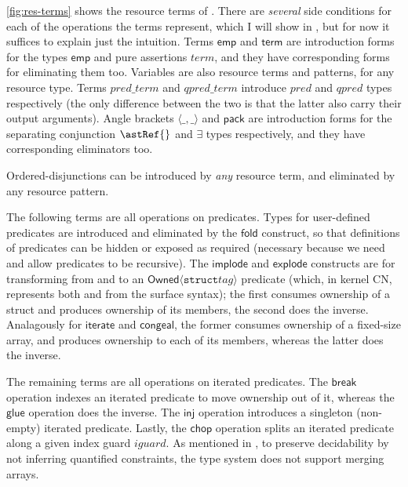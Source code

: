\cref{fig:res-terms} shows the resource terms of . There are
\emph{several} side conditions for each of the operations the terms represent,
which I will show in , but for now it suffices to
explain just the intuition. Terms $\mathsf{emp}$ and
$\mathsf{term}$ are introduction forms for the types $\mathsf{emp}$ and pure
assertions $\mathit{term}$, and they have corresponding forms for eliminating
them too. Variables are also resource terms and patterns, for any resource
type. Terms $\mathit{pred\_term}$ and $\mathit{qpred\_term}$ introduce
$\mathit{pred}$ and $\mathit{qpred}$ types respectively (the only difference
between the two is that the latter also carry their output arguments). Angle
brackets $\langle \_ , \_ \rangle$ and $\mathsf{pack}$ are introduction forms
for the separating conjunction $\astRef{}$ and $\exists$ types respectively,
and they have corresponding eliminators too.

Ordered-disjunctions can be introduced by \emph{any} resource term, and
eliminated by any resource pattern.

The following terms are all operations on predicates. Types for
user-defined predicates are introduced and eliminated by the $\mathsf{fold}$
construct, so that definitions of predicates can be hidden or exposed as required
(necessary because we need and allow predicates to be recursive). The
$\mathsf{implode}$ and $\mathsf{explode}$ constructs are for transforming from
and to an $\mathsf{Owned}\langle \mathtt{struct} \mathit{tag} \rangle$ predicate
(which, in kernel CN, represents both  and
 from the surface syntax); the first consumes ownership of
a struct and produces ownership of its members, the second does the inverse.
Analagously for $\mathsf{iterate}$ and $\mathsf{congeal}$, the former consumes
ownership of a fixed-size array, and produces ownership to each of its members,
whereas the latter does the inverse.

The remaining terms are all operations on iterated predicates. The
$\mathsf{break}$ operation indexes an iterated predicate to move ownership out
of it, whereas the $\mathsf{glue}$ operation does the inverse. The
$\mathsf{inj}$ operation introduces a singleton (non-empty) iterated
predicate.
Lastly, the $\mathsf{chop}$ operation splits an iterated predicate along a
given index guard $\mathit{iguard}$. As mentioned in
, to preserve decidability by not inferring
quantified constraints, the type system does not support merging arrays.

